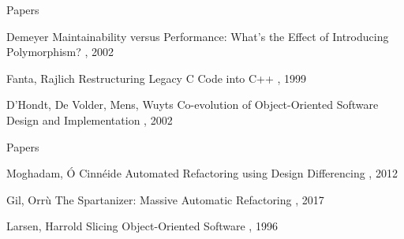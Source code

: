 \documentclass{beamer}
\begin{document}
\begin{frame}{Papers}
  \begin{thebibliography}{10}
    \beamertemplatearticlebibitems
    
      Demeyer
      \newblock Maintainability versus Performance: What's the Effect of Introducing Polymorphism?
      , 2002
    
      Fanta, Rajlich
      \newblock Restructuring Legacy C Code into C++
      , 1999
    
      D'Hondt, De Volder, Mens, Wuyts
      \newblock Co-evolution of Object-Oriented Software Design and Implementation
      , 2002
  \end{thebibliography}
\end{frame}

\begin{frame}{Papers}
  \begin{thebibliography}{10}
    \beamertemplatearticlebibitems
    
      Moghadam, Ó Cinnéide
      \newblock Automated Refactoring using Design Differencing
      , 2012
    
      Gil, Orrù
      \newblock The Spartanizer: Massive Automatic Refactoring
      , 2017
    
      Larsen, Harrold
      \newblock Slicing Object-Oriented Software
      , 1996
  \end{thebibliography}
\end{frame}
\end{document}
